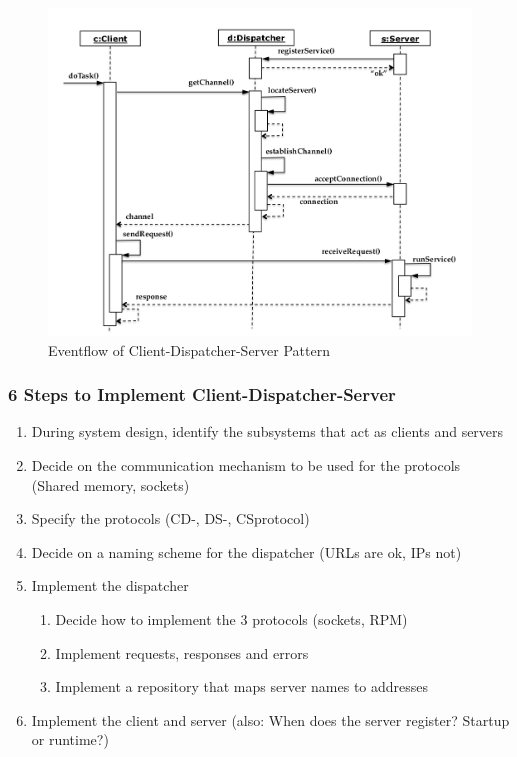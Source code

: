 \begin{figure}[H]
	\centering
	\includegraphics[width=0.9\linewidth]{images/eventflow_client_dispatcher_server.png}
	\caption{Eventflow of Client-Dispatcher-Server Pattern}\label{fig-server-dispatch-eventflow}
\end{figure}

\subsubsection*{6 Steps to Implement Client-Dispatcher-Server}
\begin{enumerate}
  \item During system design, identify the subsystems that act as clients and servers
  \item Decide on the communication mechanism to be used for the protocols (Shared memory, sockets)
  \item Specify the protocols (CD-, DS-, CSprotocol)
  \item Decide on a naming scheme for the dispatcher (URLs are ok, IPs not)
  \item Implement the dispatcher
  \begin{enumerate}
    \item Decide how to implement the 3 protocols (sockets, RPM)
    \item Implement requests, responses and errors
    \item Implement a repository that maps server names to addresses
  \end{enumerate}
  \item Implement the client and server (also: When does the server register? Startup or runtime?)
\end{enumerate}
\newpage

